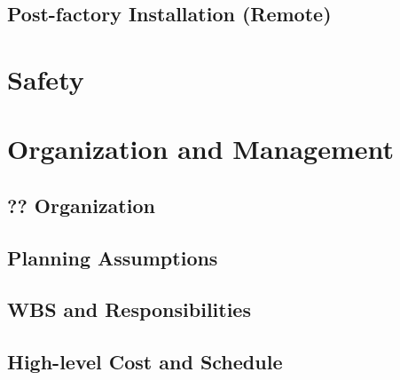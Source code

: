 \subsection{Post-factory Installation (Remote)}
\label{sec:fddp-install-qc-remote}





\section{Safety}
\label{sec:fddp-install-safety}






\section{Organization and Management}
\label{sec:fddp-install-org}

\subsection{?? Organization}
\label{sec:fddp-install-org-consortium}


\subsection{Planning Assumptions}
\label{sec:fddp-install-org-assmp}


\subsection{WBS and Responsibilities}
\label{sec:fddp-install-org-wbs}

\subsection{High-level Cost and Schedule}
\label{sec:fddp-install-org-cs}














